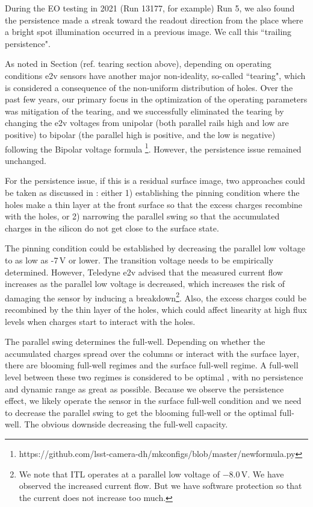 During the EO testing in 2021 (Run 13177, for example) Run 5, we also found the persistence made a
streak toward the readout direction from the place where a bright spot illumination occurred 
in a previous image. We call this ``trailing persistence".

As noted in Section (ref. tearing section above), depending on operating conditions e2v sensors have another major non-ideality, so-called ``tearing", which is
considered a consequence of the non-uniform distribution of holes. Over the past few years, our
primary focus in the optimization of the operating parameters was mitigation of the tearing, and we successfully eliminated the tearing by changing the
e2v voltages from unipolar (both parallel rails high and low
are positive) to bipolar (the parallel high is positive, and
the low is negative) following the Bipolar voltage formula
\footnote{https://github.com/lsst-camera-dh/mkconfigs/blob/master/newformula.py}.
However, the persistence issue
remained unchanged.

For the persistence issue, if this is a residual surface image, two
approaches could be taken as discussed in \citet{2024SPIE13103E..0WU}:  
either 1) establishing the pinning condition where the holes make a thin
layer at the front surface so that the excess charges recombine with
the holes, or 2) narrowing the parallel swing so that the accumulated
charges in the silicon do not get close to the surface state.

The pinning condition could be established by decreasing the parallel low
voltage to as low as -7\,V or lower. The transition voltage needs to be
empirically determined. However, Teledyne e2v advised that the measured
current flow increases as the parallel low voltage is decreased, which
increases the risk of damaging the sensor by inducing a
breakdown\footnote{We note that ITL operates at a parallel low voltage
  of $-$8.0\,V. We have observed the increased current flow. But we have
  software protection so that the current does not increase too much.}.
Also, the excess charges could be recombined by the thin layer of
the holes, which could affect linearity at high flux levels when
charges start to interact with the holes.

The parallel swing determines the full-well. Depending on whether the
accumulated charges spread over the columns or interact with the surface
layer, there are blooming full-well regimes and the surface full-well
regime. A full-well level between these two regimes is considered to be
optimal \citep{2001sccd.book.....J}, with no persistence and dynamic range as great as
possible. Because we observe the persistence effect, we likely operate the sensor in the
surface full-well condition and we need to decrease the parallel swing to
get the blooming full-well or the optimal full-well. The obvious downside
decreasing the full-well capacity.

